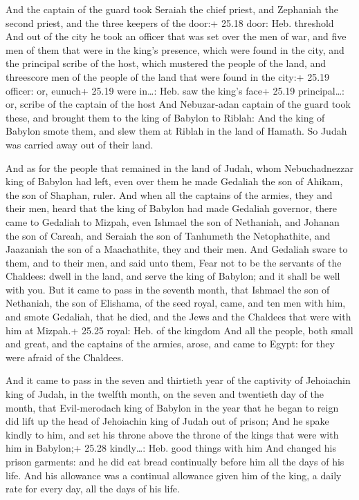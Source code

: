  And the captain of the guard took Seraiah the chief
priest, and Zephaniah the second priest, and the three keepers of the
door:+ 25.18 door: Heb. threshold  And out of the city he
took an officer that was set over the men of war, and five men of them
that were in the king's presence, which were found in the city, and the
principal scribe of the host, which mustered the people of the land, and
threescore men of the people of the land that were found in the city:+
25.19 officer: or, eunuch+ 25.19 were in\ldots: Heb. saw the king's
face+ 25.19 principal\ldots: or, scribe of the captain of the host
 And Nebuzar-adan captain of the guard took these, and
brought them to the king of Babylon to Riblah:  And the
king of Babylon smote them, and slew them at Riblah in the land of
Hamath. So Judah was carried away out of their land.

 And as for the people that remained in the land of
Judah, whom Nebuchadnezzar king of Babylon had left, even over them he
made Gedaliah the son of Ahikam, the son of Shaphan, ruler.
 And when all the captains of the armies, they and their
men, heard that the king of Babylon had made Gedaliah governor, there
came to Gedaliah to Mizpah, even Ishmael the son of Nethaniah, and
Johanan the son of Careah, and Seraiah the son of Tanhumeth the
Netophathite, and Jaazaniah the son of a Maachathite, they and their
men.  And Gedaliah sware to them, and to their men, and
said unto them, Fear not to be the servants of the Chaldees: dwell in
the land, and serve the king of Babylon; and it shall be well with you.
 But it came to pass in the seventh month, that Ishmael the
son of Nethaniah, the son of Elishama, of the seed royal, came, and ten
men with him, and smote Gedaliah, that he died, and the Jews and the
Chaldees that were with him at Mizpah.+ 25.25 royal: Heb. of the kingdom
 And all the people, both small and great, and the captains
of the armies, arose, and came to Egypt: for they were afraid of the
Chaldees.

 And it came to pass in the seven and thirtieth year of
the captivity of Jehoiachin king of Judah, in the twelfth month, on the
seven and twentieth day of the month, that Evil-merodach king of Babylon
in the year that he began to reign did lift up the head of Jehoiachin
king of Judah out of prison;  And he spake kindly to him,
and set his throne above the throne of the kings that were with him in
Babylon;+ 25.28 kindly\ldots: Heb. good things with him 
And changed his prison garments: and he did eat bread continually before
him all the days of his life.  And his allowance was a
continual allowance given him of the king, a daily rate for every day,
all the days of his life.

